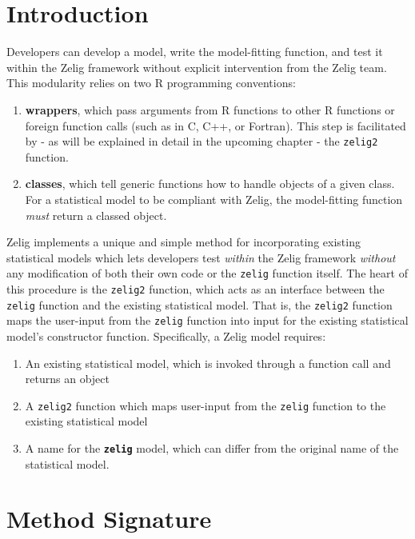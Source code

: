 \section{Introduction}
Developers can develop a model, write the model-fitting function, and test it
within the Zelig framework without explicit intervention from the Zelig team. 
This modularity relies on two R programming conventions:


\begin{enumerate}

	\item {\bf wrappers}, which pass arguments from R functions to other R functions
		or foreign function calls (such as in C, C++, or Fortran).  This step is
		facilitated by - as will be explained in detail in the upcoming chapter -
		the {\tt zelig2} function.
		
	\item {\bf classes}, which tell generic functions how to handle objects of a given
		class.  For a statistical model to be compliant with Zelig, the model-fitting
		function \emph{must} return a classed object.
		
\end{enumerate}

Zelig implements a unique and simple method for incorporating existing statistical
models which lets developers test \emph{within} the Zelig framework \emph{without} any
modification of both their own code or the {\tt zelig} function itself.  The heart of
this procedure is the {\tt zelig2} function, which acts as an interface between the
{\tt zelig} function and the existing statistical model.  That is, the {\tt zelig2}
function maps the user-input from the {\tt zelig} function into input for the existing
statistical model's constructor function.  Specifically, a Zelig model requires:

%
\begin{enumerate}
  \item An existing statistical model, which is invoked through a function call and returns an object
  \item A {\tt zelig2} function which maps user-input from the {\tt zelig} function to the existing statistical model
  \item A name for the {\tt \bf zelig} model, which can differ from the original name of the statistical model.
\end{enumerate}



\section{ Method Signature}
\label{section:zelig2-signature}

